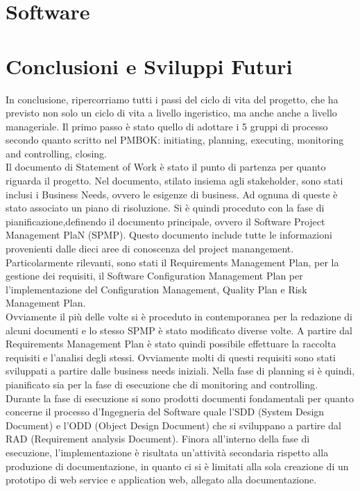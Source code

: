 \documentclass[conference]{IEEEtran}
\begin{document}
\section{Software}
\label{software}



\section{Conclusioni e Sviluppi Futuri}
In conclusione, ripercorriamo tutti i passi del ciclo di vita del progetto, che ha previsto non solo un ciclo di vita a livello ingeristico, ma anche anche a livello manageriale. Il primo passo \`{e} stato quello di adottare i 5 gruppi di processo secondo quanto scritto nel PMBOK: initiating, planning, executing, monitoring and controlling, closing.\\
Il documento di Statement of Work \`{e} stato il punto di partenza per quanto riguarda il progetto. Nel documento, stilato insiema agli stakeholder, sono stati inclusi i Business Needs, ovvero le esigenze di business. Ad ognuna di queste \`{e} stato associato un piano di risoluzione.
Si \`{e} quindi proceduto con la fase di pianificazione,definendo il documento principale, ovvero il Software Project Management PlaN (SPMP). Questo documento include tutte le informazioni provenienti dalle dieci aree di conoscenza del project manangement. Particolarmente rilevanti, sono stati il Requirements Management Plan, per la gestione dei requisiti, il Software Configuration Management Plan per l\rq implementazione del Configuration Management, Quality Plan e Risk Management Plan.\\
Ovviamente il pi\`{u} delle volte si \`{e} proceduto in contemporanea per la redazione di alcuni documenti e lo stesso SPMP \`{e} stato modificato diverse volte.
A partire dal Requirements Management Plan \`{e} stato quindi possibile effettuare la raccolta requisiti e l\rq analisi degli stessi. Ovviamente molti di questi requisiti sono stati sviluppati a partire dalle business needs iniziali. 
Nella fase di planning si \`{e} quindi, pianificato sia per la fase di esecuzione che di monitoring and controlling. \\
Durante la fase di esecuzione si sono prodotti documenti fondamentali per quanto concerne il processo d\rq Ingegneria del Software quale l\rq SDD (System Design Document) e l\rq ODD (Object Design Document) che si sviluppano a partire dal RAD (Requirement analysis Document).
Finora all\rq interno della fase di esecuzione, l\rq implementazione \`{e} risultata un\rq attivit\`{a} secondaria rispetto alla produzione di documentazione, in quanto ci si \`{e} limitati alla sola creazione di un prototipo di web service e application web, allegato alla documentazione.
\end{document}

